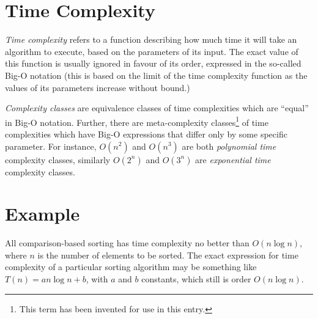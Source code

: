 \documentclass{article}
\begin{document}
\section{Time Complexity} 

\emph{Time complexity} refers to a function describing how much time it will take an algorithm to execute, based on the parameters of its input.  The exact value of this function is usually ignored in favour of its order, expressed in the so-called Big-O notation (this is based on the limit of the time complexity function as the values of its parameters increase without bound.)

\emph{Complexity classes} are equivalence classes of time complexities which are ``equal'' in Big-O notation.  Further, there are meta-complexity classes\footnote{This term has been invented for use in this entry.} of time complexities which have Big-O expressions that differ only by some specific parameter.  For instance, $O(n^2)$ and $O(n^3)$ are both \emph{polynomial time} complexity classes, similarly $O(2^n)$ and $O(3^n)$ are \emph{exponential time} complexity classes.

\section{Example}

All comparison-based sorting has time complexity no better than $O(n \log n)$, where $n$ is the number of elements to be sorted. The exact expression for time complexity of a particular sorting algorithm may be something like $T(n)= a n \log  n + b$, with $a$ and $b$ constants, which still is order $O(n \log n)$.
\end{document}
